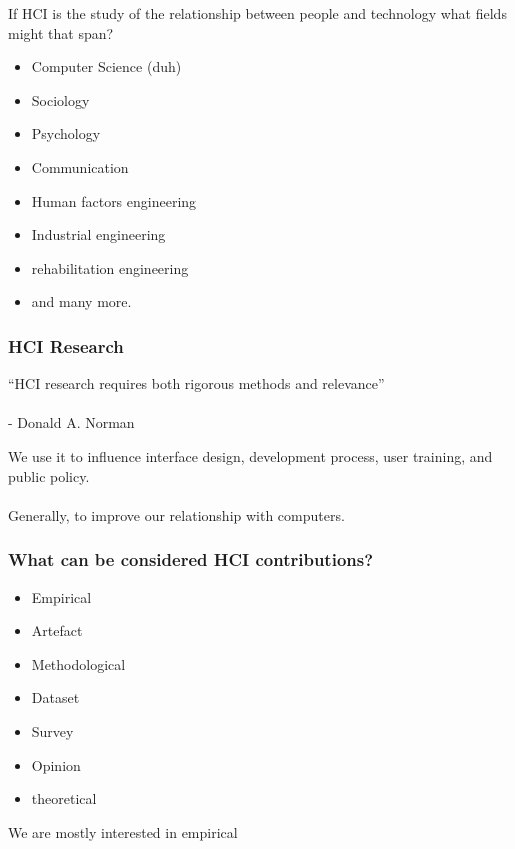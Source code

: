 \begin{frame}
	\begin{center}
		If HCI is the study of the relationship between people and technology what fields might that span?
	\end{center}
	\pause
	\begin{itemize}
		\item Computer Science (duh)
		\item Sociology
		\item Psychology
		\item Communication
		\item Human factors engineering
		\item Industrial engineering
		\item rehabilitation engineering
		\item and many more.
	\end{itemize}	
\end{frame}

\begin{frame}
	\frametitle{HCI Research}
	\begin{displayquote}	
		``HCI research requires both rigorous methods and relevance'' \\ ~ \\ - Donald A. Norman
	\end{displayquote} 
	\pause
	
	
	We use it to influence interface design, development process, user training, and public policy. \\ ~ \\
	Generally, to improve our relationship with computers.

\end{frame}

\begin{frame}
		
	\frametitle{What can be considered HCI contributions?}

	\begin{itemize}
		\item Empirical
		\item Artefact
		\item Methodological
		\item Dataset
		\item Survey	
		\item Opinion
		\item theoretical
	\end{itemize}

	We are mostly interested in empirical
\end{frame}

